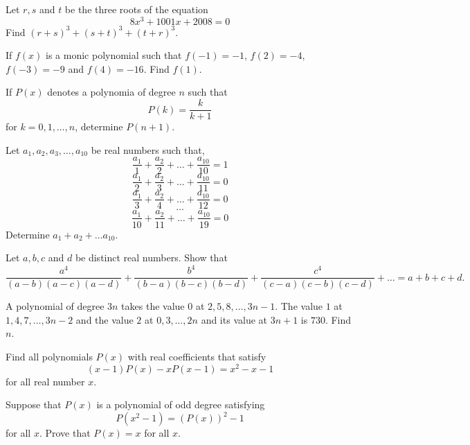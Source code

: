 \begin{problem}
Let $r,s$ and $ t $ be the three roots of the equation
\[ 8x^3 + 1001x +2008=0\]
Find $(r+s)^3 + (s+t)^3 + (t+r)^3$.
\begin{hint}
\addhint{}
\addhint{}
\end{hint}
\end{problem}
\begin{problem}
If $f(x)$ is a monic polynomial such that $f(-1)=-1$, $f(2)=-4$, $f(-3)= -9$ and $f(4)=-16$. Find $f(1)$.
\begin{hint}
\addhint{}
\addhint{}
\end{hint}
\end{problem}
\begin{problem}
If $P(x)$ denotes a polynomia of degree $n$ such that \[P(k) = \frac{k}{k+1}\]
for $k= 0,1,\ldots ,n$, determine $P(n+1)$.
\begin{hint}
\addhint{}
\addhint{}
\end{hint}
\end{problem}
\begin{problem}
Let $a_1, a_2, a_3, \ldots, a_{10} $ be real numbers such that, 
\[\frac{a_1}{1}+ \frac{a_2}{2} +\ldots + \frac{a_{10}}{10} =1 \]
\[\frac{a_1}{2}+ \frac{a_2}{3} +\ldots + \frac{a_{10}}{11} =0 \]
\[\frac{a_1}{3}+ \frac{a_2}{4} +\ldots + \frac{a_{10}}{12} =0 \]
\[\ldots\]
\[\frac{a_1}{10}+ \frac{a_2}{11} +\ldots + \frac{a_{10}}{19} =0 \]
 Determine $a_1+a_2+ \ldots a_10$.

\begin{hint}
\addhint{}
\addhint{}
\end{hint}
\end{problem}
\begin{problem}
Let $a,b,c$ and $d$ be distinct real numbers. Show that 
\[\frac{a^4}{(a-b)(a-c)(a-d)}+\frac{b^4}{(b-a)(b-c)(b-d)}+\frac{c^4}{(c-a)(c-b)(c-d)}+\ldots=a+b+c+d.\]
\begin{hint}
\addhint{}
\addhint{}
\end{hint}
\end{problem}
\begin{problem}
A polynomial of degree $3n$ takes the value $0$ at $2,5,8,\ldots,3n-1$. The value $1$ at $1,4,7,\ldots, 3n-2$ and the value $2$ at $0,3, \ldots, 2n$ and its value at $3n+1$ is $730$. Find $n$.
\begin{hint}
\addhint{}
\addhint{}
\end{hint}
\end{problem}
\begin{problem}
Find all polynomials $P(x)$ with real coefficients that satisfy
\[(x-1)P(x)-xP(x-1)= x^2-x-1\]
for all real number $x$.
\begin{hint}
\addhint{}
\addhint{}
\end{hint}
\end{problem}
\begin{problem}
Suppose that $P(x)$ is a polynomial of odd degree satisfying 
\[P(x^2-1)=(P(x))^2 -1\]
for all $x$. Prove that $P(x)= x$ for all $x$.
\begin{hint}
\addhint{}
\addhint{}
\end{hint}
\end{problem}